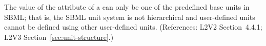 The value of the  attribute of a \Unit can only be
one of the predefined base units in SBML; that is, the SBML unit
system is not hierarchical and user-defined units cannot be defined using
other user-defined units.  (References: L2V2 Section~4.4.1;
L2V3 Section~\ref{sec:unit-structure}.)
